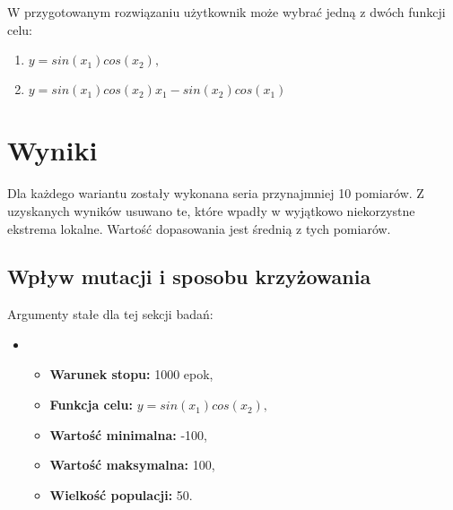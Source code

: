 \documentclass{classrep}
\begin{document}
W przygotowanym rozwiązaniu użytkownik może wybrać jedną z dwóch funkcji celu:

\begin{enumerate}
    \item $y=sin(x_1)cos(x_2),$
    \item$ y=sin(x_1)cos(x_2)x_1 - sin(x_2)cos(x_1) $
\end{enumerate}

\section{Wyniki}

Dla każdego wariantu zostały wykonana seria przynajmniej 10 pomiarów. Z uzyskanych wyników usuwano te, które wpadły w wyjątkowo niekorzystne ekstrema lokalne. Wartość dopasowania jest średnią z tych pomiarów.\\

\subsection{Wpływ mutacji i sposobu krzyżowania}

Argumenty stałe dla tej sekcji badań:
\begin{itemize}
    \item[]
    \begin{itemize}
        \item \textbf{Warunek stopu:} 1000 epok,
        \item \textbf{Funkcja celu:} $y=sin(x_1)cos(x_2),$
        \item \textbf{Wartość minimalna:} -100,
        \item \textbf{Wartość maksymalna:} 100,
        \item \textbf{Wielkość populacji:} 50.
    \end{itemize}
\end{itemize}
\end{document}
